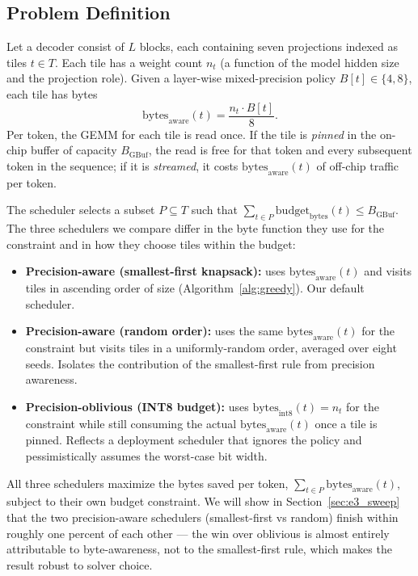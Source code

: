 \documentclass{ieeeaccess}
\begin{document}
\subsection{Problem Definition}
Let a decoder consist of $L$ blocks, each containing seven projections
indexed as tiles $t \in T$. Each tile has a weight count $n_t$ (a
function of the model hidden size and the projection role). Given a
layer-wise mixed-precision policy $B[t] \in \{4, 8\}$, each tile has
bytes
\begin{equation}
\mathrm{bytes}_{\mathrm{aware}}(t) = \frac{n_t \cdot B[t]}{8}.
\label{eq:bytes_aware}
\end{equation}
Per token, the GEMM for each tile is read once. If the tile is
\emph{pinned} in the on-chip buffer of capacity $B_{\mathrm{GBuf}}$,
the read is free for that token and every subsequent token in the
sequence; if it is \emph{streamed}, it costs
$\mathrm{bytes}_{\mathrm{aware}}(t)$ of off-chip traffic per token.

The scheduler selects a subset $P \subseteq T$ such that
$\sum_{t \in P} \mathrm{budget}_{\mathrm{bytes}}(t) \le B_{\mathrm{GBuf}}$.
The three schedulers we compare differ in the byte function they use
for the constraint and in how they choose tiles within the budget:
\begin{itemize}
\item \textbf{Precision-aware (smallest-first knapsack):} uses
$\mathrm{bytes}_{\mathrm{aware}}(t)$ and visits tiles in ascending
order of size (Algorithm~\ref{alg:greedy}). Our default scheduler.
\item \textbf{Precision-aware (random order):} uses the same
$\mathrm{bytes}_{\mathrm{aware}}(t)$ for the constraint but visits
tiles in a uniformly-random order, averaged over eight seeds. Isolates
the contribution of the smallest-first rule from precision awareness.
\item \textbf{Precision-oblivious (INT8 budget):} uses
$\mathrm{bytes}_{\mathrm{int8}}(t) = n_t$ for the constraint while still
consuming the actual $\mathrm{bytes}_{\mathrm{aware}}(t)$ once a tile is
pinned. Reflects a deployment scheduler that ignores the policy and
pessimistically assumes the worst-case bit width.
\end{itemize}
All three schedulers maximize the bytes saved per token,
$\sum_{t \in P} \mathrm{bytes}_{\mathrm{aware}}(t)$, subject to their
own budget constraint. We will show in Section~\ref{sec:e3_sweep} that
the two precision-aware schedulers (smallest-first vs random) finish
within roughly one percent of each other --- the win over oblivious is
almost entirely attributable to byte-awareness, not to the
smallest-first rule, which makes the result robust to solver choice.
\end{document}

